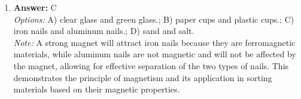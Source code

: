 \documentclass[12pt]{article}
\begin{document}
\begin{enumerate}[label=\arabic*.]
\\ \textit{Note:} A person whose gallbladder has been removed may experience difficulty digesting high-fat foods, such as cheese, because the gallbladder's role in storing bile, which emulsifies fats, is lost, leading to potential digestive discomfort and malabsorption.
\item \textbf{Answer:} C
\\ \textit{Options:} A) clear glass and green glass.; B) paper cups and plastic cups.; C) iron nails and aluminum nails.; D) sand and salt.
\\ \textit{Note:} A strong magnet will attract iron nails because they are ferromagnetic materials, while aluminum nails are not magnetic and will not be affected by the magnet, allowing for effective separation of the two types of nails. This demonstrates the principle of magnetism and its application in sorting materials based on their magnetic properties.
\end{enumerate}
\end{document}
